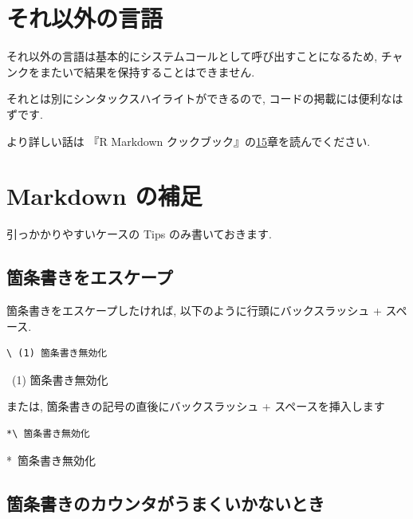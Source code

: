 \documentclass[
]{bxjsarticle}
\begin{document}
\hypertarget{ux305dux308cux4ee5ux5916ux306eux8a00ux8a9e}{%
\section{それ以外の言語}\label{ux305dux308cux4ee5ux5916ux306eux8a00ux8a9e}}

それ以外の言語は基本的にシステムコールとして呼び出すことになるため, チャンクをまたいで結果を保持することはできません.

それとは別にシンタックスハイライトができるので, コードの掲載には便利なはずです.

より詳しい話は 『R Markdown クックブック』の\href{https://gedevan-aleksizde.github.io/rmarkdown-cookbook/other-languages.html}{15}章を読んでください.

\hypertarget{markdown-ux306eux88dcux8db3}{%
\section{Markdown の補足}\label{markdown-ux306eux88dcux8db3}}

引っかかりやすいケースの Tips のみ書いておきます.

\hypertarget{ux7b87ux6761ux66f8ux304dux3092ux30a8ux30b9ux30b1ux30fcux30d7}{%
\subsection{箇条書きをエスケープ}\label{ux7b87ux6761ux66f8ux304dux3092ux30a8ux30b9ux30b1ux30fcux30d7}}

箇条書きをエスケープしたければ, 以下のように行頭にバックスラッシュ + スペース.

\begin{verbatim}
\ (1) 箇条書き無効化
\end{verbatim}

~(1) 箇条書き無効化

または, 箇条書きの記号の直後にバックスラッシュ + スペースを挿入します

\begin{verbatim}
*\ 箇条書き無効化
\end{verbatim}

*~箇条書き無効化

\hypertarget{ux7b87ux6761ux66f8ux304dux306eux30abux30a6ux30f3ux30bfux304cux3046ux307eux304fux3044ux304bux306aux3044ux3068ux304d}{%
\subsection{箇条書きのカウンタがうまくいかないとき}\label{ux7b87ux6761ux66f8ux304dux306eux30abux30a6ux30f3ux30bfux304cux3046ux307eux304fux3044ux304bux306aux3044ux3068ux304d}}
\end{document}
